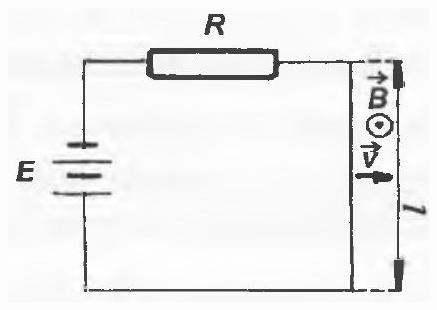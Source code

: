 \documentclass[10pt]{article}
\begin{document}
\includegraphics[max width=\textwidth, center]{2025_07_01_5b3ff9fa0d508c8e9f17g-177}
\end{document}
